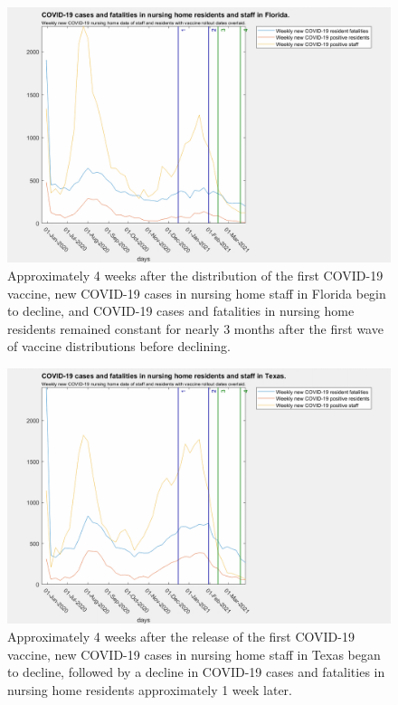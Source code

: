 \documentclass[twoside]{article}
\begin{document}
\begin{multicols}{2}
\begin{figure}[H]
	\includegraphics[width=\linewidth]{images/florida_nursing_home_with_vaccine.png}
	\caption{Approximately 4 weeks after the distribution of the first COVID-19 vaccine, new COVID-19 cases in nursing home staff in Florida begin to decline, and COVID-19 cases and fatalities in nursing home residents remained constant for nearly 3 months after the first wave of vaccine distributions before declining.}
	\label{fig:images/florida_nursing_home_with_vaccineLabel}
\end{figure}

\begin{figure}[H]
	\includegraphics[width=\linewidth]{images/texas_nursing_home_with_vaccine.png}
	\caption{Approximately 4 weeks after the release of the first COVID-19 vaccine, new COVID-19 cases in nursing home staff in Texas began to decline, followed by a decline in COVID-19 cases and fatalities in nursing home residents approximately 1 week later. }
	\label{fig:images/texas_nursing_home_with_vaccineLabel}
\end{figure}


\end{multicols}
\end{document}
